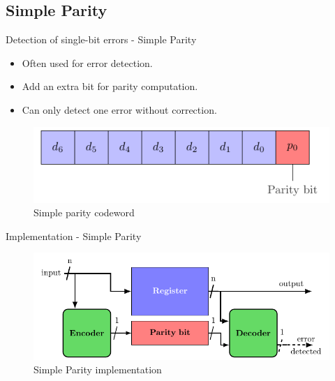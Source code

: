 \subsection{Simple Parity}
    \begin{frame}{Detection of single-bit errors - Simple Parity}
        \begin{block}{}
            \begin{itemize}
                \justifying
                \item Often used for error detection.
                \item Add an extra bit for parity computation.
                \item Can only detect one error without correction.
            \end{itemize}
        \end{block}

        \vfill
        
        \begin{figure}
            \centering
            \includegraphics[width=.5\textwidth, page=1]{src/4_strategies/img/simple_parity.pdf}
            \caption{Simple parity codeword}
            \label{fig:simple_parity_codeword}
        \end{figure}
    \end{frame}

    \begin{frame}{Implementation - Simple Parity}
        \begin{figure}
            \centering
            \includegraphics[width=.75\textwidth, page=1]{src/4_strategies/img/archi_contremesures.pdf}
            \caption{Simple Parity implementation}
            \label{fig:simple_parity_implem}
        \end{figure}
    \end{frame}
